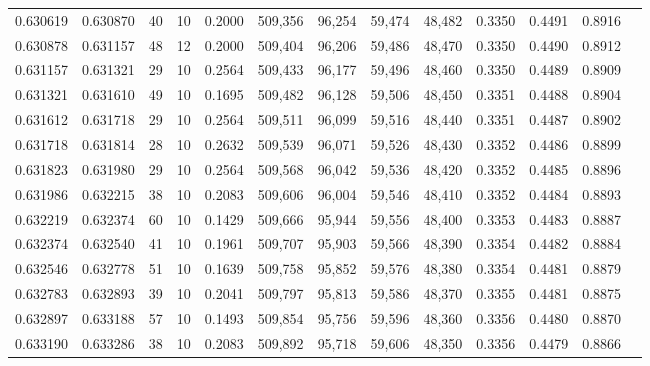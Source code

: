 \begin{tabular}{rrrrrrrrrrrrr}
0.630619 & 0.630870 &    40 &  10 &                                     0.2000 & 509,356 &  96,254 &  59,474 &  48,482 & 0.3350 & 0.4491 & 0.8916 \\
0.630878 & 0.631157 &    48 &  12 &                                     0.2000 & 509,404 &  96,206 &  59,486 &  48,470 & 0.3350 & 0.4490 & 0.8912 \\
0.631157 & 0.631321 &    29 &  10 &                                     0.2564 & 509,433 &  96,177 &  59,496 &  48,460 & 0.3350 & 0.4489 & 0.8909 \\
0.631321 & 0.631610 &    49 &  10 &                                     0.1695 & 509,482 &  96,128 &  59,506 &  48,450 & 0.3351 & 0.4488 & 0.8904 \\
0.631612 & 0.631718 &    29 &  10 &                                     0.2564 & 509,511 &  96,099 &  59,516 &  48,440 & 0.3351 & 0.4487 & 0.8902 \\
0.631718 & 0.631814 &    28 &  10 &                                     0.2632 & 509,539 &  96,071 &  59,526 &  48,430 & 0.3352 & 0.4486 & 0.8899 \\
0.631823 & 0.631980 &    29 &  10 &                                     0.2564 & 509,568 &  96,042 &  59,536 &  48,420 & 0.3352 & 0.4485 & 0.8896 \\
0.631986 & 0.632215 &    38 &  10 &                                     0.2083 & 509,606 &  96,004 &  59,546 &  48,410 & 0.3352 & 0.4484 & 0.8893 \\
0.632219 & 0.632374 &    60 &  10 &                                     0.1429 & 509,666 &  95,944 &  59,556 &  48,400 & 0.3353 & 0.4483 & 0.8887 \\
0.632374 & 0.632540 &    41 &  10 &                                     0.1961 & 509,707 &  95,903 &  59,566 &  48,390 & 0.3354 & 0.4482 & 0.8884 \\
0.632546 & 0.632778 &    51 &  10 &                                     0.1639 & 509,758 &  95,852 &  59,576 &  48,380 & 0.3354 & 0.4481 & 0.8879 \\
0.632783 & 0.632893 &    39 &  10 &                                     0.2041 & 509,797 &  95,813 &  59,586 &  48,370 & 0.3355 & 0.4481 & 0.8875 \\
0.632897 & 0.633188 &    57 &  10 &                                     0.1493 & 509,854 &  95,756 &  59,596 &  48,360 & 0.3356 & 0.4480 & 0.8870 \\
0.633190 & 0.633286 &    38 &  10 &                                     0.2083 & 509,892 &  95,718 &  59,606 &  48,350 & 0.3356 & 0.4479 & 0.8866 \\

\end{tabular}

